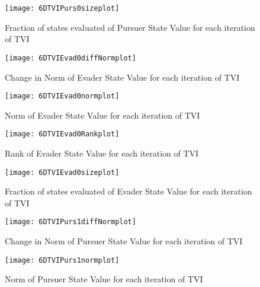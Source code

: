 \begin{figure}
\vspace{2.4in}
\centering
\texttt{[image: 6DTVIPurs0sizeplot]}
\caption{Fraction of states evaluated of Pursuer State Value for each iteration of TVI}
\label{6DTVIPurs0sizeplot}
\end{figure}
\clearpage
\newpage

\begin{figure}
\vspace{2.4in}
\centering
\texttt{[image: 6DTVIEvad0diffNormplot]}
\caption{Change in Norm of Evader State Value for each iteration of TVI}
\label{6DTVIEvad0diffNormplot}
\end{figure}
\clearpage
\newpage

\begin{figure}
\vspace{2.4in}
\centering
\texttt{[image: 6DTVIEvad0normplot]}
\caption{Norm of Evader State Value for each iteration of TVI}
\label{6DTVIEvad0normplot}
\end{figure}
\clearpage
\newpage

\begin{figure}
\vspace{2.4in}
\centering
\texttt{[image: 6DTVIEvad0Rankplot]}
\caption{Rank of Evader State Value for each iteration of TVI}
\label{6DTVIEvad0Rankplot}
\end{figure}
\clearpage
\newpage

\begin{figure}
\vspace{2.4in}
\centering
\texttt{[image: 6DTVIEvad0sizeplot]}
\caption{Fraction of states evaluated of Evader State Value for each iteration of TVI}
\label{6DTVIEvad0sizeplot}
\end{figure}
\clearpage
\newpage

\begin{figure}
\vspace{2.4in}
\centering
\texttt{[image: 6DTVIPurs1diffNormplot]}
\caption{Change in Norm of Pursuer State Value for each iteration of TVI}
\label{6DTVIPurs1diffNormplot}
\end{figure}
\clearpage
\newpage

\begin{figure}
\vspace{2.4in}
\centering
\texttt{[image: 6DTVIPurs1normplot]}
\caption{Norm of Pursuer State Value for each iteration of TVI}
\label{6DTVIPurs1normplot}
\end{figure}
\clearpage
\newpage

